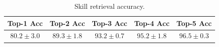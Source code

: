 \begin{table}[!ht]
\vskip 0.1in
\centering
\caption{Skill retrieval accuracy.}
    \begin{tabular}{ccccc}
        \toprule
        Top-1 Acc & Top-2 Acc & Top-3 Acc & Top-4 Acc & Top-5 Acc \\
        \midrule
        $80.2 \pm 3.0$ & $89.3 \pm 1.8$ & $93.2 \pm 0.7$ & $95.2 \pm 1.8$ & $96.5 \pm 0.3$ \\
        \bottomrule
    \end{tabular}
\label{supp:table:skill_retrieval}
\end{table}

